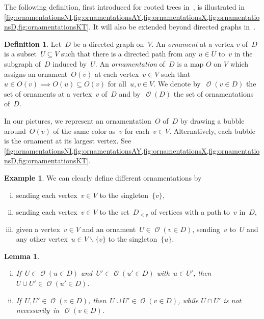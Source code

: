 \documentclass{amsart}
\newtheorem{lemma}[theorem]{Lemma}
\theoremstyle{definition}
\newtheorem{definition}[theorem]{Definition}
\newtheorem{example}[theorem]{Example}
\renewcommand{\c}[1]{\mathcal{#1}} %
\newcommand{\ssm}{\smallsetminus} %
\newcommand{\darkblue}{\color{darkblue}} %
\newcommand{\defn}[1]{\textsl{\darkblue #1}} %
\newcommand{\lessin}[2]{#1_{\le#2}} %
\DeclareMathOperator{\Orn}{\c{O}}  %
\begin{document}
The following definition, first introduced for rooted trees in~\cite{DefantSack}, is illustrated in \cref{fig:ornamentationsNI,fig:ornamentationsAY,fig:ornamentationsX,fig:ornamentationsD,fig:ornamentationsKT}.
It will also be extended beyond directed graphs in~\cite{Sack}.

\begin{definition}
\label{def:Orn}
Let~$D$ be a directed graph on~$V$.
An \defn{ornament} at a vertex $v$ of~$D$ is a subset~$U \subseteq V$ such that there is a directed path from any $u \in U$ to~$v$ in the subgraph of~$D$ induced by~$U$.
An \defn{ornamentation} of~$D$ is a map $O$ on $V$ which assigns an ornament~$O(v)$ at each vertex~$v \in V$ such that~$u \in O(v) \implies O(u) \subseteq O(v)$ for all~$u,v \in V$.
We denote by~$\Orn(v \in D)$ the set of ornaments at a vertex~$v$ of~$D$ and by~$\Orn(D)$ the set of ornamentations of~$D$.
\end{definition}

In our pictures, we represent an ornamentation~$O$ of~$D$ by drawing a bubble around~$O(v)$ of the same color as~$v$ for each~$v \in V$.
Alternatively, each bubble is the ornament at its largest vertex.
See \cref{fig:ornamentationsNI,fig:ornamentationsAY,fig:ornamentationsX,fig:ornamentationsD,fig:ornamentationsKT}.

\begin{example}
\label{exm:ornamentations}
We can clearly define different ornamentations by
\begin{enumerate}[(i)]
\item sending each vertex~$v \in V$ to the singleton~$\{v\}$, 
\item sending each vertex~$v \in V$ to the set~$\lessin{D}{v}$ of vertices with a path to~$v$ in~$D$,
\item given a vertex~$v \in V$ and an ornament~$U \in \Orn(v \in D)$, sending~$v$ to~$U$ and any other vertex~${u \in V \ssm \{v\}}$ to the singleton~$\{u\}$.
\end{enumerate}
\end{example}

\begin{lemma}
\label{lem:unionOrnaments}
\begin{enumerate}[(i)]
\item If~$U \in \Orn(u \in D)$ and~$U' \in \Orn(u' \in D)$ with~$u \in U'$, then~${U \cup U' \in \Orn(u' \in D)}$.
\item If~$U,U' \in \Orn(v \in D)$, then~$U \cup U' \in \Orn(v \in D)$, while $U \cap U'$ is not necessarily~in~${\Orn(v \in D)}$.
\end{enumerate}
\end{lemma}
\end{document}
